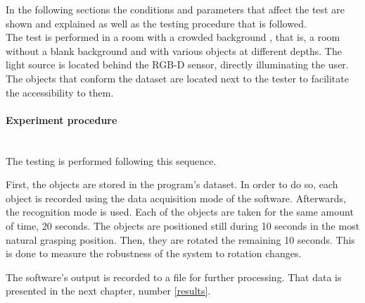 	In the following sections the conditions and parameters that affect the test are shown and explained as well as the testing procedure that is followed. \\[0.5cm]

		The test is performed in a room with a crowded background , that is, a room without a blank background and with various objects at different depths.
		The light source is located behind the RGB-D sensor, directly illuminating the user. 
		The objects that conform the dataset are located next to the tester to facilitate the accessibility to them. 
		\\%

	\paragraph{Experiment procedure}\mbox{}\\

		The testing is performed following this sequence. 



		First, the objects are stored in the program's dataset. 
		In order to do so, each object is recorded using the data acquisition mode of the software. 
		Afterwards, the recognition mode is used.
		Each of the objects are taken for the same amount of time, 20 seconds. 
		The objects are positioned still during 10 seconds in the most natural grasping position. 
		Then, they are rotated the remaining 10 seconds. 
		This is done to measure the robustness of the system to rotation changes. 

		The software's output is recorded to a file for further processing. 
		That data is presented in the next chapter, number \ref{results}.
		\\

